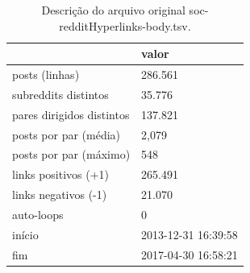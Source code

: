 \begin{table}[htbp]
\centering
\small
\caption{Descrição do arquivo original soc-redditHyperlinks-body.tsv.}
\label{tab:01_dados_originais}
\begin{tabular}{ll}
\toprule
 & valor \\
\midrule
posts (linhas) & 286.561 \\
subreddits distintos & 35.776 \\
pares dirigidos distintos & 137.821 \\
posts por par (média) & 2,079 \\
posts por par (máximo) & 548 \\
links positivos (+1) & 265.491 \\
links negativos (-1) & 21.070 \\
auto-loops & 0 \\
início & 2013-12-31 16:39:58 \\
fim & 2017-04-30 16:58:21 \\
\bottomrule
\end{tabular}
\end{table}
